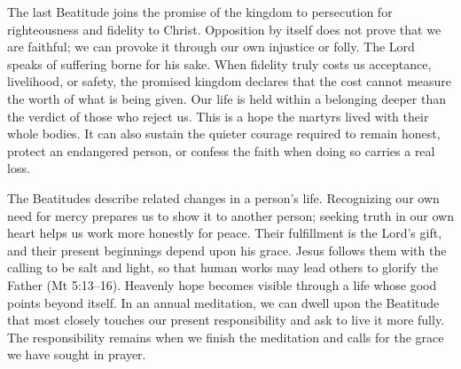 The last Beatitude joins the promise of the kingdom to persecution for righteousness and fidelity to Christ. Opposition by itself does not prove that we are faithful; we can provoke it through our own injustice or folly. The Lord speaks of suffering borne for his sake. When fidelity truly costs us acceptance, livelihood, or safety, the promised kingdom declares that the cost cannot measure the worth of what is being given. Our life is held within a belonging deeper than the verdict of those who reject us. This is a hope the martyrs lived with their whole bodies. It can also sustain the quieter courage required to remain honest, protect an endangered person, or confess the faith when doing so carries a real loss.

The Beatitudes describe related changes in a person's life. Recognizing our own need for mercy prepares us to show it to another person; seeking truth in our own heart helps us work more honestly for peace. Their fulfillment is the Lord's gift, and their present beginnings depend upon his grace. Jesus follows them with the calling to be salt and light, so that human works may lead others to glorify the Father (Mt 5:13--16). Heavenly hope becomes visible through a life whose good points beyond itself. In an annual meditation, we can dwell upon the Beatitude that most closely touches our present responsibility and ask to live it more fully. The responsibility remains when we finish the meditation and calls for the grace we have sought in prayer.

